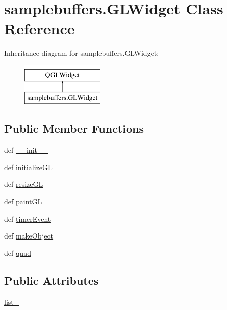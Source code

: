 \hypertarget{classsamplebuffers_1_1GLWidget}{}\section{samplebuffers.\+G\+L\+Widget Class Reference}
\label{classsamplebuffers_1_1GLWidget}
Inheritance diagram for samplebuffers.\+G\+L\+Widget\+:\begin{figure}[H]
\begin{center}
\leavevmode
\includegraphics[height=2.000000cm]{classsamplebuffers_1_1GLWidget}
\end{center}
\end{figure}
\subsection*{Public Member Functions}
\begin{DoxyCompactItemize}
\item 
def \hyperlink{classsamplebuffers_1_1GLWidget_a99a3d21c2eb762af34089dd3122cc14f}{\+\_\+\+\_\+init\+\_\+\+\_\+}
\item 
def \hyperlink{classsamplebuffers_1_1GLWidget_a88dc08a97125591f821a7e2a91ae87b1}{initialize\+G\+L}
\item 
def \hyperlink{classsamplebuffers_1_1GLWidget_adf16aa4e156629f4bcddd2501a54176a}{resize\+G\+L}
\item 
def \hyperlink{classsamplebuffers_1_1GLWidget_a948dfd1f0133b48eaa4983cdaa1b79b1}{paint\+G\+L}
\item 
def \hyperlink{classsamplebuffers_1_1GLWidget_a22ee6b4d40ccfca1f1190c9dc4454553}{timer\+Event}
\item 
def \hyperlink{classsamplebuffers_1_1GLWidget_ac4feb25d136af93f51831176c8c5b31e}{make\+Object}
\item 
def \hyperlink{classsamplebuffers_1_1GLWidget_a45761f09a94db3e50061d6b4d06848e6}{quad}
\end{DoxyCompactItemize}
\subsection*{Public Attributes}
\begin{DoxyCompactItemize}
\item 
\hyperlink{classsamplebuffers_1_1GLWidget_a722af7356009ccc61b5a4f79ea8a46a4}{list\+\_\+}
\end{DoxyCompactItemize}
